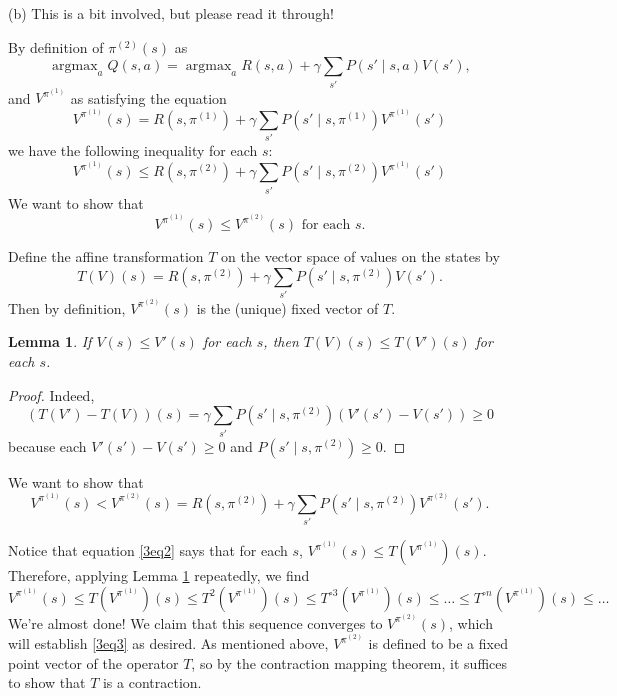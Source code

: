 \documentclass[12pt]{article}
\DeclareMathOperator{\argmax}{argmax}
\newtheorem{lemma}[thm]{Lemma}
\theoremstyle{remark}
\begin{document}
\noindent (b) This is a bit involved, but please read it through!

By definition of $\pi^{(2)}(s)$ as 
\[
\argmax_a Q(s,a) = \argmax_a R(s,a) + \gamma \sum_{s'} P(s' \mid s,a) V(s'),
\]
and $V^{\pi^{(1)}}$ as satisfying the equation 
\[
V^{\pi^{(1)}} (s) = R(s, \pi^{(1)}) + \gamma \sum_{s'} P(s' \mid s, \pi^{(1)} ) V^{\pi^{(1)}}(s')
\]
we have the following inequality for each $s$:
\begin{equation}\label{3eq2}
V^{\pi^{(1)}} (s) \leq R(s, \pi^{(2)}) + \gamma \sum_{s'} P(s' \mid s, \pi^{(2)} ) V^{\pi^{(1)}}(s') 
\end{equation}
We want to show that 
\begin{equation}\label{3eq3}
V^{\pi^{(1)}}(s) \leq V^{\pi^{(2)}}(s) \text{ for each }s.
\end{equation}

Define the affine transformation $T$ on the vector space of values on the states by 
\[
T(V)(s) =  R(s, \pi^{(2)}) + \gamma \sum_{s'} P(s' \mid s, \pi^{(2)} ) V(s').
\]
Then by definition, $V^{\pi^{(2)}}(s)$ is the (unique) fixed vector of $T$. 

\begin{lemma}\label{3lem1}
If $V(s) \leq V'(s)$ for each $s$, then $T(V)(s) \leq T(V')(s)$ for each $s$. 
\end{lemma}

\begin{proof}
Indeed, 
\[
(T(V')-T(V))(s) = \gamma \sum_{s'} P(s' \mid s, \pi^{(2)}) (V'(s') - V(s')) \geq 0
\]
because each $V'(s')-V(s') \geq 0$ and $P(s' \mid s, \pi^{(2)}) \geq 0$. 
\end{proof}

We want to show that 
\begin{equation}\label{3eq3}
V^{\pi^{(1)}}(s)  < V^{\pi^{(2)}} (s)  = R(s, \pi^{(2)}) + \gamma \sum_{s'} P(s' \mid s, \pi^{(2)} ) V^{\pi^{(2)}}(s'). 
\end{equation}

Notice that equation \eqref{3eq2} says that for each $s$, $V^{\pi^{(1)}}(s) \leq T(V^{\pi^{(1)}})(s)$. Therefore, applying Lemma \ref{3lem1} repeatedly, we find 
\[
V^{\pi^{(1)}}(s) \leq T(V^{\pi^{(1)}})(s) \leq T^2(V^{\pi^{(1)}})(s) \leq T^{\circ 3}(V^{\pi^{(1)}})(s) \leq \ldots \leq T^{\circ n}(V^{\pi^{(1)}})(s) \leq \ldots
\]
We're almost done! We claim that this sequence converges to $V^{\pi^{(2)}}(s)$, which will establish \eqref{3eq3} as desired. As mentioned above, $V^{\pi^{(2)}}$ is defined to be a fixed point vector of the operator $T$, so by the contraction mapping theorem, it suffices to show that $T$ is a contraction.
\end{document}
